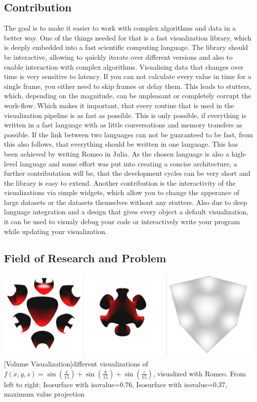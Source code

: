 \subsection{Contribution}

The goal is to make it easier to work with complex algorithms and data in a better way.
One of the things needed for that is a fast visualization library, which is deeply embedded into a fast scientific computing language. The library should be interactive, allowing to quickly iterate over different versions and also to enable interaction with complex algorithms.
Visualising data that changes over time is very sensitive to latency. If you can not calculate every value in time for a single frame, you either need to skip frames or delay them.
This leads to stutters, which, depending on the magnitude, can be unpleasant or completely corrupt the work-flow.
Which makes it important, that every routine that is used in the visualization pipeline is as fast as possible.
This is only possible, if everything is written in a fast language with as little conversations and memory transfers as possible. If the link between two languages can not be guaranteed to be fast, from this also follows, that everything should be written in one language.
This has been achieved by writing Romeo in Julia.
As the chosen language is also a high-level language and some effort was put into creating a concise architecture, a further contributation will be, that the development cycles can be very short and the library is easy to extend.
Another contribution is the interactivity of the visualizations via simple widgets, which allow you to change the apperance of large datasets or the datasets themselves without any stutters.
Also due to deep language integration and a design that gives every object a default visualization, it can be used to visualy debug your code or interactively write your program while updating your visualization.


\subsection{Field of Research and Problem}

\vspace{1em}
\begin{minipage}{\linewidth}
    \centering
    \includegraphics[width=0.7\linewidth]{graphics/surfaces.png}
    [Volume Visualization]{different visualizations of $f(x,y,z)=\sin(\frac{x}{15})+\sin(\frac{y}{15})+\sin(\frac{z}{15})$, visualized with Romeo. From left to right: Isosurface with isovalue=0.76, Isosurface with isovalue=0.37, maximum value projection}
    \label{fig:volume}
\end{minipage}
\vspace{1em}

